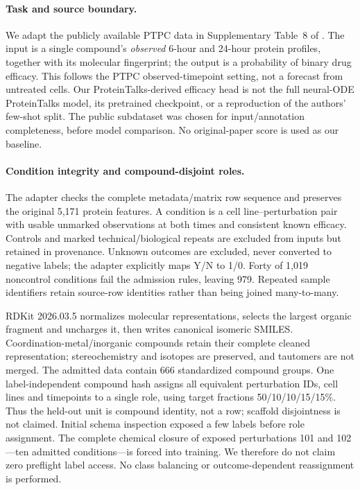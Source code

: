 \paragraph{Task and source boundary.}
We adapt the publicly available PTPC data in Supplementary Table~8 of
\citet{Sun2026ProteinTalks}. The input is a single compound's \emph{observed}
6-hour and 24-hour protein profiles, together with its molecular fingerprint;
the output is a probability of binary drug efficacy. This follows the PTPC
observed-timepoint setting, not a forecast from untreated cells. Our
ProteinTalks-derived efficacy head is not the full neural-ODE ProteinTalks
model, its pretrained checkpoint, or a reproduction of the authors' few-shot
split. The public subdataset was chosen for input/annotation completeness,
before model comparison. No original-paper score is used as our baseline.

\paragraph{Condition integrity and compound-disjoint roles.}
The adapter checks the complete metadata/matrix row sequence and preserves
the original 5,171 protein features. A condition is a cell line--perturbation
pair with usable unmarked observations at both times and consistent known
efficacy. Controls and marked technical/biological repeats are excluded from
inputs but retained in provenance. Unknown outcomes are excluded, never
converted to negative labels; the adapter explicitly maps Y/N to 1/0.
Forty of 1,019 noncontrol conditions fail the admission rules, leaving 979.
Repeated sample identifiers retain source-row identities rather than being
joined many-to-many.

RDKit 2026.03.5 normalizes molecular representations, selects the largest
organic fragment and uncharges it, then writes canonical isomeric SMILES.
Coordination-metal/inorganic compounds retain their complete cleaned
representation; stereochemistry and isotopes are preserved, and tautomers
are not merged. The admitted data contain 666 standardized compound groups.
One label-independent compound hash assigns all equivalent perturbation IDs,
cell lines and timepoints to a single role, using target fractions
50/10/10/15/15\%. Thus the held-out unit is compound identity, not a row;
scaffold disjointness is not claimed. Initial schema inspection exposed a
few labels before role assignment. The complete chemical closure of exposed
perturbations 101 and 102---ten admitted conditions---is forced into training.
We therefore do not claim zero preflight label access. No class balancing or
outcome-dependent reassignment is performed.

